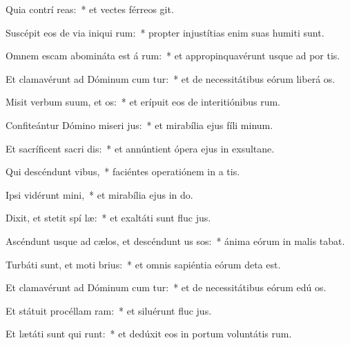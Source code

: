 \item Quia contrí  reas:~* et vectes férreos git.
\item Suscépit eos de via iniqui rum:~* propter injustítias enim suas humiti sunt.
\item Omnem escam abomináta est á rum:~* et appropinquavérunt usque ad por tis.
\item Et clamavérunt ad Dóminum cum tur:~* et de necessitátibus eórum liberá os.
\item Misit verbum suum, et  os:~* et erípuit eos de interitiónibus rum.
\item Confiteántur Dómino miseri jus:~* et mirabília ejus fíli minum.
\item Et sacríficent sacri dis:~* et annúntient ópera ejus in exsultane.
\item Qui descéndunt   vibus,~* faciéntes operatiónem in a tis.
\item Ipsi vidérunt  mini,~* et mirabília ejus in do.
\item Dixit, et stetit spí læ:~* et exaltáti sunt fluc jus.
\item Ascéndunt usque ad cælos, et descéndunt us  sos:~* ánima eórum in malis tabat.
\item Turbáti sunt, et moti   brius:~* et omnis sapiéntia eórum deta est.
\item Et clamavérunt ad Dóminum cum tur:~* et de necessitátibus eórum edú os.
\item Et státuit procéllam   ram:~* et siluérunt fluc jus.
\item Et lætáti sunt qui runt:~* et dedúxit eos in portum voluntátis rum.
